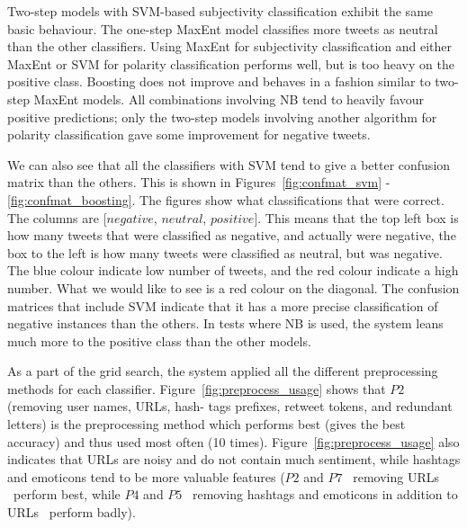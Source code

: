 Two-step models with SVM-based subjectivity classification exhibit the same basic behaviour. The one-step MaxEnt model classifies more tweets as neutral than the other classifiers. Using MaxEnt for subjectivity classification and either MaxEnt or SVM for polarity classification performs well, but is too heavy on the positive class. Boosting does not improve and behaves in a fashion similar to two-step MaxEnt models. All combinations involving NB tend to heavily favour positive predictions; only the two-step models involving another algorithm for polarity classification gave some improvement for negative tweets.

We can also see that all the classifiers with SVM tend to give a better confusion matrix than the others. This is shown in Figures~\ref{fig:confmat_svm} - \ref{fig:confmat_boosting}. The figures show what classifications that were correct. The columns are [$negative$, $neutral$, $positive$]. This means that the top left box is how many tweets that were classified as negative, and actually were negative, the box to the left is how many tweets were classified as neutral, but was negative. The blue colour indicate low number of tweets, and the red colour indicate a high number. What we would like to see is a red colour on the diagonal. The confusion matrices that include SVM indicate that it has a more precise classification of negative instances than the others. In tests where NB is used, the system leans much more to the positive class than the other models.

As a part of the grid search, the system applied all the different preprocessing methods for each classifier. Figure~\ref{fig:preprocess_usage} shows that $P2$ (removing user names, URLs, hash- tags prefixes, retweet tokens, and redundant letters) is the preprocessing method which performs best (gives the best accuracy) and thus used most often (10 times). Figure~\ref{fig:preprocess_usage} also indicates that URLs are noisy and do not contain much sentiment, while hashtags and emoticons tend to be more valuable features ($P2$ and $P7$ \textemdash~removing URLs \textemdash~perform best, while $P4$ and $P5$ \textemdash~removing hashtags and emoticons in addition to URLs \textemdash~perform badly).

